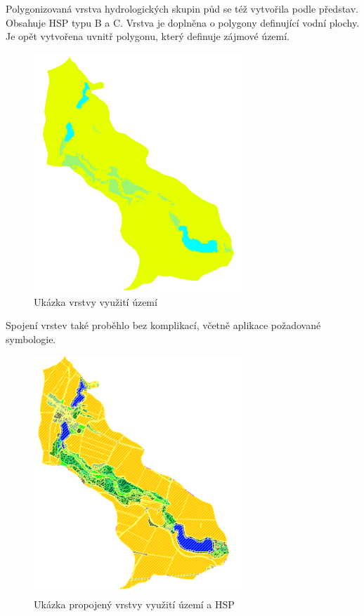 \documentclass[a4paper,oneside,12pt]{book}
\begin{document}
\hspace{10mm} Polygonizovaná vrstva hydrologických skupin půd se též vytvořila podle představ. Obsahuje HSP typu B a C. Vrstva je doplněna o polygony definující vodní plochy. Je opět vytvořena uvnitř polygonu, který definuje zájmové území.

\begin{figure}[H] \label{obr26}
\centering
\includegraphics[height=9cm]{pictures/casestudy3.png}
\caption{Ukázka vrstvy využití území}
\label{cs3}
\end{figure}

\hspace{10mm} Spojení vrstev také proběhlo bez komplikací, včetně aplikace požadované symbologie.

\begin{figure}[H] \label{obr27}
\centering
\includegraphics[height=9cm]{pictures/casestudy4.png}
\caption{Ukázka propojený vrstvy využití území a HSP}
\label{cs4}
\end{figure}
\end{document}
